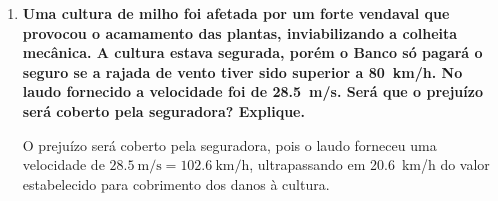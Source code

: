 \documentclass[a4paper, 12pt]{article}
\newcommand{\tbf}[1]{\textbf{#1}}
\begin{document}
\begin{enumerate}
		\item\tbf{Uma cultura de milho foi afetada por um forte vendaval que provocou o acamamento das plantas, inviabilizando a colheita mecânica. A cultura estava segurada, porém o Banco só pagará o seguro se a rajada de vento tiver sido superior a \SI{80}{\kilo\meter/\hour}. No laudo fornecido a velocidade foi de \SI{28.5}{\meter/\second}. Será que o prejuízo será coberto pela seguradora? Explique.}
		
		O prejuízo será coberto pela seguradora, pois o laudo forneceu uma velocidade de $\SI{28.5}{\meter/\second}=\SI{102.6}{\kilo\meter/\hour}$, ultrapassando em \SI{20.6}{\kilo\meter/\hour} do valor estabelecido para cobrimento dos danos à cultura.
	\end{enumerate}
\end{document}
